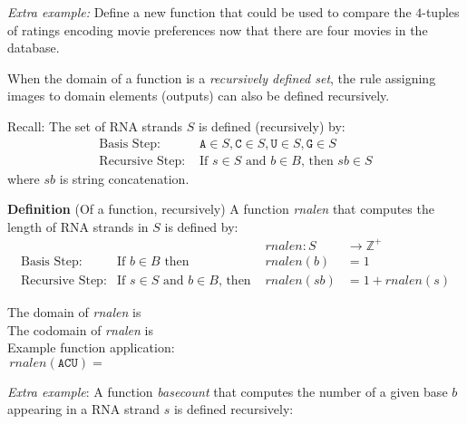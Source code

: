 \documentclass[12pt, oneside]{article}
\newcommand{\A}[0]{\texttt{A}}
\newcommand{\C}[0]{\texttt{C}}
\newcommand{\G}[0]{\texttt{G}}
\newcommand{\U}[0]{\texttt{U}}
\begin{document}
{\it Extra example:} Define a new function that could be used to compare the $4$-tuples of ratings encoding
movie preferences now that there are four movies in the database.

\vfill
\newpage 

When the domain of a function is a {\it recursively defined set}, the rule assigning 
images to domain elements (outputs) can also be defined recursively.

Recall: The set of RNA strands $S$ is defined (recursively) by:
\[
\begin{array}{ll}
\textrm{Basis Step: } & \A \in S, \C \in S, \U \in S, \G \in S \\
\textrm{Recursive Step: } & \textrm{If } s \in S\textrm{ and }b \in B \textrm{, then }sb \in S
\end{array}
\]
where $sb$ is string concatenation.

{\bf Definition} (Of a function, recursively) A function \textit{rnalen} that computes the length of RNA strands in $S$ is defined by:
\[
\begin{array}{llll}
& & \textit{rnalen} : S & \to \mathbb{Z}^+ \\
\textrm{Basis Step:} & \textrm{If } b \in B\textrm{ then } & \textit{rnalen}(b) & = 1 \\
\textrm{Recursive Step:} & \textrm{If } s \in S\textrm{ and }b \in B\textrm{, then  } & \textit{rnalen}(sb) & = 1 + \textit{rnalen}(s)
\end{array}
\]

The domain of \textit{rnalen} is \phantom{$S$}\\

The codomain of \textit{rnalen} is \\

Example function application:
\[
rnalen(\A\C\U) = \phantom{1+ rnalen(\A\C) = 1 + (1 + rnalen(\A) ) = 1 + ( 1 + 1) = 3}
\]

\vfill

{\it Extra example}: A function \textit{basecount} that computes the number of a given base 
$b$ appearing in a RNA strand $s$ is defined recursively:
    
\end{document}

